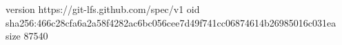 version https://git-lfs.github.com/spec/v1
oid sha256:466c28cfa6a2a58f4282ac6bc056cee7d49f741cc06874614b26985016c031ea
size 87540
